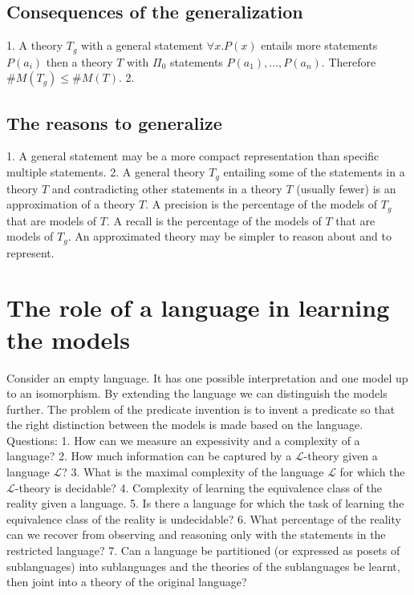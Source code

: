 \subsection{Consequences of the generalization}
1. A theory $T_g$ with a general statement $\forall x.P(x)$ entails more statements $P(a_i)$ then a theory $T$ with $\Pi_0$ statements $P(a_1), ..., P(a_n)$. Therefore $\#M(T_g) \leq \#M(T)$.
2. 
\fi
\subsection{The reasons to generalize}
1. A general statement may be a more compact representation than specific multiple statements.
2. A general theory $T_g$ entailing some of the statements in a theory $T$ and contradicting other statements in a theory $T$ (usually fewer) is an approximation of a theory $T$. A precision is the percentage of the models of $T_g$ that are models of $T$. A recall is the percentage of the models of $T$ that are models of $T_g$. An approximated theory may be simpler to reason about and to represent.
\iffalse
\subsection{How do the models of a theory and their number change during generalization and specialization?}
\fi
\section{The role of a language in learning the models}
Consider an empty language. It has one possible interpretation and one model up to an isomorphism.
By extending the language we can distinguish the models further. The problem of the predicate invention is to invent a predicate so that the right distinction between the models is made based on the language.
Questions:
1. How can we measure an expessivity and a complexity of a language?
2. How much information can be captured by a $\mathcal{L}$-theory given a language $\mathcal{L}$?
3. What is the maximal complexity of the language $\mathcal{L}$ for which the $\mathcal{L}$-theory is decidable?
4. Complexity of learning the equivalence class of the reality given a language.
5. Is there a language for which the task of learning the equivalence class of the reality is undecidable?
6. What percentage of the reality can we recover from observing and reasoning only with the statements in the restricted language?
7. Can a language be partitioned (or expressed as posets of sublanguages) into sublanguages and the theories of the sublanguages be learnt, then joint into a theory of the original language?
\iffalse
